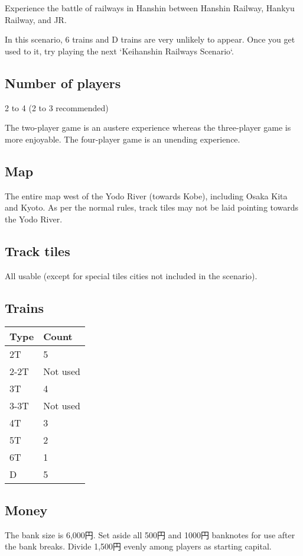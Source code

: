 \documentclass{article}
\begin{document}
\begin{CJK}{UTF8}{min}
\begin{multicols}{2}
Experience the battle of railways in Hanshin between Hanshin Railway,
Hankyu Railway, and JR.

In this scenario, 6 trains and D trains are very unlikely to
appear. Once you get used to it, try playing the next `Keihanshin
Railways Scenario`.

\subsection{Number of players}

2 to 4 (2 to 3 recommended)

The two-player game is an austere experience whereas the three-player
game is more enjoyable. The four-player game is an unending
experience.

\subsection{Map}

The entire map west of the Yodo River (towards Kobe), including Osaka
Kita and Kyoto. As per the normal rules, track tiles may not be laid
pointing towards the Yodo River.

\subsection{Track tiles}

All usable (except for special tiles cities not included in the scenario).

\subsection{Trains}
\begin{tabular}{ll}
Type & Count \\
\hline
2T & 5\\
2-2T & Not used\\
3T & 4 \\
3-3T & Not used \\
4T & 3 \\
5T & 2 \\
6T & 1 \\
D & 5
\end{tabular}

\subsection{Money}
The bank size is 6,000円. Set aside all 500円 and 1000円
banknotes for use after the bank breaks. Divide 1,500円 evenly
among players as starting capital.


\end{multicols}
\end{CJK}
\end{document}
